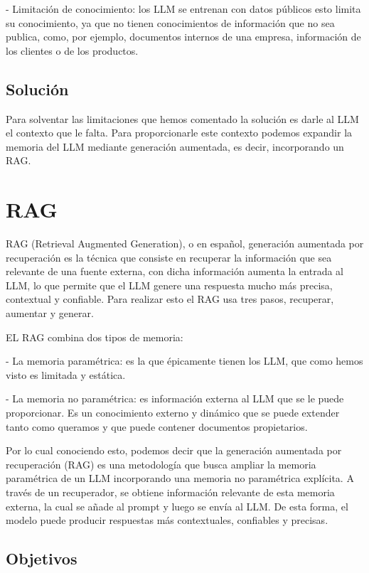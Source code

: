 - Limitación de conocimiento: los LLM se entrenan con datos públicos esto limita su conocimiento, ya que no tienen conocimientos de información que no sea publica, como, por ejemplo, documentos internos de una empresa, información de los clientes o de los productos.

\subsection{Solución}

Para solventar las limitaciones que hemos comentado la solución es darle al LLM el contexto que le falta. Para proporcionarle este contexto podemos expandir la memoria del LLM mediante generación aumentada, es decir, incorporando un RAG.

\section{RAG}

RAG (Retrieval Augmented Generation), o en español, generación aumentada por recuperación es la técnica que consiste en recuperar la información que sea relevante de una fuente externa, con dicha información aumenta la entrada al LLM, lo que permite que el LLM genere una respuesta mucho más precisa, contextual y confiable. Para realizar esto el RAG usa tres pasos, recuperar, aumentar y generar. 

EL RAG combina dos tipos de memoria:

- La memoria paramétrica: es la que épicamente tienen los LLM, que como hemos visto es limitada y estática. 

- La memoria no paramétrica: es información externa al LLM que se le puede proporcionar. Es un conocimiento externo y dinámico que se puede extender tanto como queramos y que puede contener documentos propietarios.

Por lo cual conociendo esto, podemos decir que la generación aumentada por recuperación (RAG) es una metodología que busca ampliar la memoria paramétrica de un LLM incorporando una memoria no paramétrica explícita. A través de un recuperador, se obtiene información relevante de esta memoria externa, la cual se añade al prompt y luego se envía al LLM. De esta forma, el modelo puede producir respuestas más contextuales, confiables y precisas.

\subsection{Objetivos}

